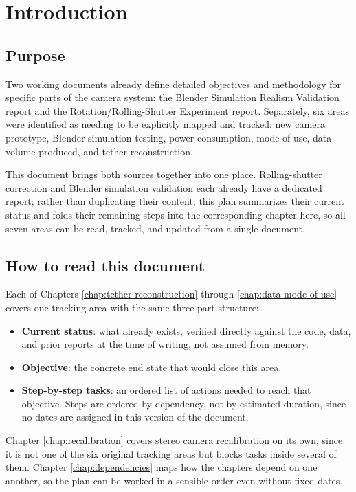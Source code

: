 \chapter{Introduction}
\label{chap:introduction}

\section{Purpose}

Two working documents already define detailed objectives and methodology for specific parts of the camera system: the Blender Simulation Realism Validation report and the Rotation/Rolling-Shutter Experiment report. Separately, six areas were identified as needing to be explicitly mapped and tracked: new camera prototype, Blender simulation testing, power consumption, mode of use, data volume produced, and tether reconstruction.

This document brings both sources together into one place. Rolling-shutter correction and Blender simulation validation each already have a dedicated report; rather than duplicating their content, this plan summarizes their current status and folds their remaining steps into the corresponding chapter here, so all seven areas can be read, tracked, and updated from a single document.

\section{How to read this document}

Each of Chapters \ref{chap:tether-reconstruction} through \ref{chap:data-mode-of-use} covers one tracking area with the same three-part structure:

\begin{itemize}
    \item \textbf{Current status}: what already exists, verified directly against the code, data, and prior reports at the time of writing, not assumed from memory.
    \item \textbf{Objective}: the concrete end state that would close this area.
    \item \textbf{Step-by-step tasks}: an ordered list of actions needed to reach that objective. Steps are ordered by dependency, not by estimated duration, since no dates are assigned in this version of the document.
\end{itemize}

Chapter \ref{chap:recalibration} covers stereo camera recalibration on its own, since it is not one of the six original tracking areas but blocks tasks inside several of them. Chapter \ref{chap:dependencies} maps how the chapters depend on one another, so the plan can be worked in a sensible order even without fixed dates.

